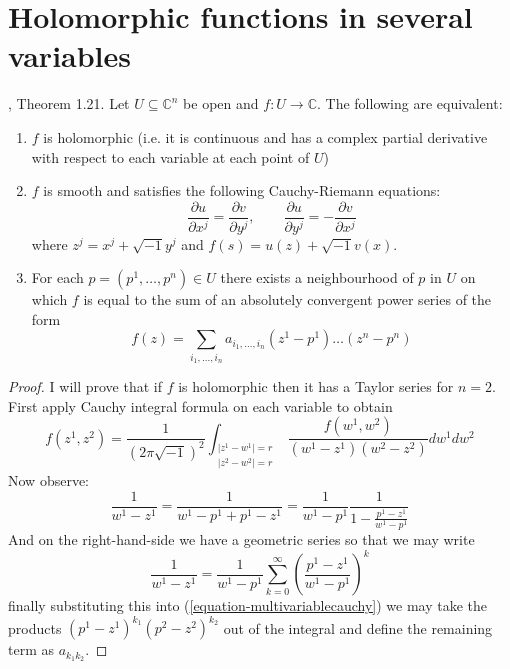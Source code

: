 \section{Holomorphic functions in several
variables}
\label{section-holom-funct-sever-varia}

\begin{lemma}
\label{lemma-holom-funct-chara}
\cite{lec}, Theorem 1.21. Let
$U\subseteq\mathbb{C}^n$ be open and $f:U\to
\mathbb{C}$. The following are equivalent:
\begin{enumerate}
\item $f$ is holomorphic (i.e. it is
continuous and has a complex partial
derivative with respect to each variable at
each point of $U$)
\item $f$ is smooth and satisfies the
following Cauchy-Riemann equations:
\begin{equation}
\label{equationcauchy-equat-riema-sever}
\frac{\partial u}{\partial
x^j}=\frac{\partial v}{\partial y^j},\qquad
\frac{\partial u}{\partial
y^j}=-\frac{\partial v}{\partial x^j}
\end{equation}
where $z^j=x^j+\sqrt{-1}y^j$ and
$f(s)=u(z)+\sqrt{-1}v(x)$.
\item For each $p=(p^1,\ldots,p^n)\in U$
there exists a neighbourhood of $p$ in
$U$ on which $f$ is equal to the sum of an
absolutely convergent power series of
the form
\begin{equation}
\label{equation-taylo-serie-sever-varia}
f(z)=\sum_{i_1,\ldots,i_n}a_{i_1,\ldots,i_n}
(z^1-p^1)\ldots(z^n-p^n)
\end{equation}
\end{enumerate}
\end{lemma}

\begin{proof}
I will prove that if $f$ is holomorphic then
it has a Taylor series for $n=2$.
First apply Cauchy integral formula on each
variable to obtain
$$
f(z^1,z^2)=\frac{1}{(2\pi\sqrt{-1})^2}
\int_{\substack{|z^1-w^1|=r \\ |z^2-w^2|=r}}
\frac{f(w^1,w^2)}{(w^1-z^1)(w^2-z^2)}dw^1dw^2
$$
Now observe:
\begin{equation}
\label{equation-multivariablecauchy}
\frac{1}{w^1-z^1}=\frac{1}{w^1-p^1+p^1-z^1}
=\frac{1}{w^1-p^1}\frac{1}{1-\frac{p^1-z^1}
{w^1-p^1}}
\end{equation}
And on the right-hand-side we have a
geometric series so that we may write
$$
\frac{1}{w^1-z^1}
=\frac{1}{w^1-p^1}\sum_{k=0}
^\infty\left(\frac{p^1-z^1}{w^1-p^1}\right)^k
$$
finally substituting this into
(\ref{equation-multivariablecauchy}) we may
take
the products $(p^1-z^1)^{k_1}(p^2-z^2)^{k_2}$
out of the integral and define the
remaining term as $a_{k_1k_2}$.
\end{proof}

